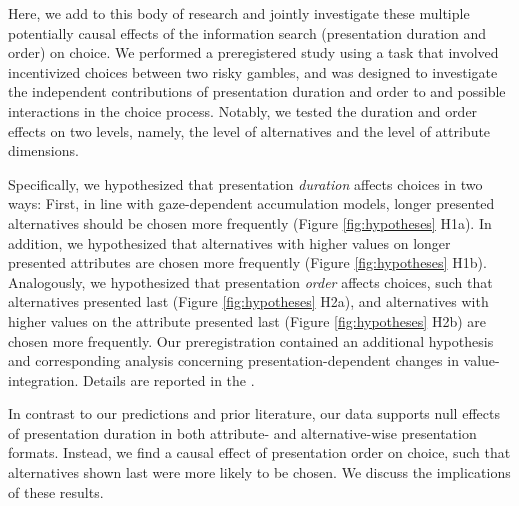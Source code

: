 \documentclass[11pt, a4paper, twocolumn, abstract]{scrartcl}
\begin{document}
Here, we add to this body of research and jointly investigate these multiple potentially causal effects of the information search (presentation duration and order) on choice. We performed a preregistered study using a task that involved incentivized choices between two risky gambles, and was designed to investigate the independent contributions of presentation duration and order to and possible interactions in the choice process. Notably, we tested the duration and order effects on two levels, namely, the level of alternatives and the level of attribute dimensions.

Specifically, we hypothesized that presentation \emph{duration} affects choices in two ways: First, in line with gaze-dependent accumulation models, longer presented alternatives should be chosen more frequently (Figure \ref{fig:hypotheses} H1a). In addition, we hypothesized that alternatives with higher values on longer presented attributes are chosen more frequently (Figure \ref{fig:hypotheses} H1b).
Analogously, we hypothesized that presentation \emph{order} affects choices, such that alternatives presented last (Figure \ref{fig:hypotheses} H2a), and alternatives with higher values on the attribute presented last (Figure \ref{fig:hypotheses} H2b) are chosen more frequently. Our preregistration contained an additional hypothesis and corresponding analysis concerning presentation-dependent changes in value-integration. Details are reported in the .

In contrast to our predictions and prior literature, our data supports null effects of presentation duration in both attribute- and alternative-wise presentation formats. Instead, we find a causal effect of presentation order on choice, such that alternatives shown last were more likely to be chosen. We discuss the implications of these results.
\end{document}
